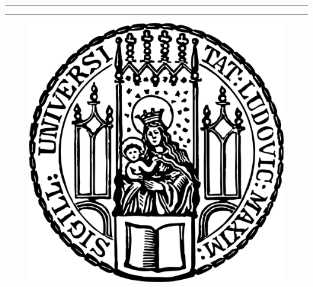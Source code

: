 \begin{titlepage}   

    {\parindent0cm
    \rule{\linewidth}{.4ex}}  
  \begin{center}
    {\sffamily \bfseries \Huge \getTitleEN}
  \end{center}
    \rule{\linewidth}{.4ex}
  

  \begin{center}



  \begin{figure}[!h]
    \centering
    \includegraphics[scale=0.15]{figures/lmu-siegel.png}
  \end{figure}
  

     {\scshape \large

}
\end{center}
\end{titlepage}
